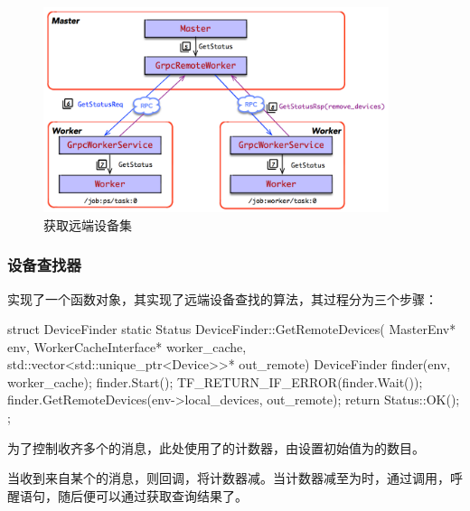 \begin{content}
\begin{figure}[H]
\centering
\includegraphics[width=0.9\textwidth]{figures/dist-worker-get-status.png}
\caption{获取远端设备集}
 \label{fig:dist-worker-get-status}
\end{figure}

\subsubsection{设备查找器}

实现了一个函数对象，其实现了远端设备查找的算法，其过程分为三个步骤：

\begin{enum}
\end{enum}

\begin{leftbar}
\begin{c++}
struct DeviceFinder {
  static Status DeviceFinder::GetRemoteDevices(
      MasterEnv* env,
      WorkerCacheInterface* worker_cache,
      std::vector<std::unique_ptr<Device>>* out_remote) {
    DeviceFinder finder(env, worker_cache);
    finder.Start();
    TF_RETURN_IF_ERROR(finder.Wait());
    finder.GetRemoteDevices(env->local_devices, out_remote);
    return Status::OK();
  }
};
\end{c++}
\end{leftbar}

为了控制收齐多个的消息，此处使用了的计数器，由设置初始值为的数目。

当收到来自某个的消息，则回调，将计数器减。当计数器减至为时，通过调用，呼醒语句，随后便可以通过获取查询结果了。


\end{content}
